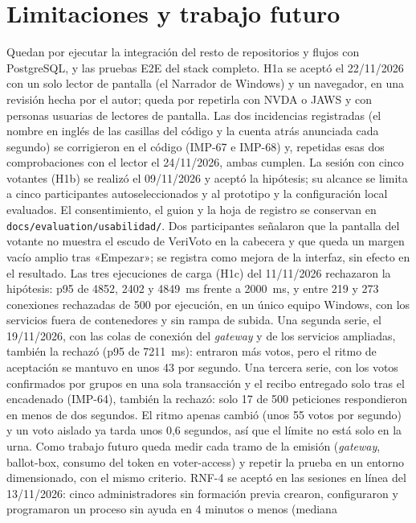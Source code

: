 \section{Limitaciones y trabajo futuro}
\label{sec:limitaciones-trabajo-futuro}
Quedan por ejecutar la integración del resto de repositorios y flujos con PostgreSQL,
y las pruebas E2E del stack completo. H1a se aceptó el 22/11/2026 con un solo lector de
pantalla (el Narrador de Windows) y un navegador, en una revisión hecha por el autor; queda
por repetirla con NVDA o JAWS y con personas usuarias de lectores de pantalla. Las dos
incidencias registradas (el nombre en inglés de las casillas del código y la cuenta atrás
anunciada cada segundo) se corrigieron en el código (IMP-67 e IMP-68) y, repetidas esas
dos comprobaciones con el lector el 24/11/2026, ambas cumplen. La sesión con cinco votantes (H1b) se realizó el
09/11/2026 y aceptó la hipótesis; su alcance se limita a cinco participantes
autoseleccionados y al prototipo y la configuración local evaluados. El
consentimiento, el guion y la hoja de registro se conservan en
\texttt{docs/evaluation/usabilidad/}. Dos participantes señalaron que la
pantalla del votante no muestra el escudo de VeriVoto en la cabecera y que
queda un margen vacío amplio tras «Empezar»; se registra como mejora de la
interfaz, sin efecto en el resultado. Las tres ejecuciones de carga (H1c) del
11/11/2026 rechazaron la hipótesis: p95 de 4852, 2402 y 4849~ms frente a
2000~ms, y entre 219 y 273 conexiones rechazadas de 500 por ejecución, en un
único equipo Windows, con los servicios fuera de contenedores y sin rampa de
subida. Una segunda serie, el 19/11/2026, con las colas de conexión del
\emph{gateway} y de los servicios ampliadas, también la rechazó (p95 de
7211~ms): entraron más votos, pero el ritmo de aceptación se mantuvo en unos 43
por segundo. Una tercera serie, con los votos confirmados por grupos en una
sola transacción y el recibo entregado solo tras el encadenado (IMP-64), también
la rechazó: solo 17 de 500 peticiones respondieron en menos de dos segundos. El
ritmo apenas cambió (unos 55 votos por segundo) y un voto aislado ya tarda unos
0,6 segundos, así que el límite no está solo en la urna. Como trabajo futuro
queda medir cada tramo de la emisión (\emph{gateway}, ballot-box, consumo del
token en voter-access) y repetir la prueba en un entorno dimensionado, con el
mismo criterio. RNF-4 se aceptó en las sesiones en línea del 13/11/2026: cinco administradores sin formación previa crearon,
configuraron y programaron un proceso sin ayuda en 4 minutos o menos (mediana
